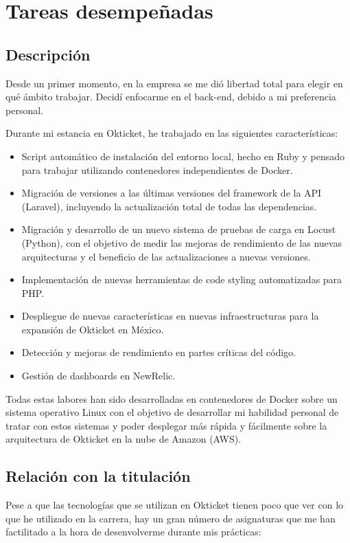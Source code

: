 \chapter{Tareas desempeñadas}
\section{Descripción}
Desde un primer momento, en la empresa se me dió libertad total para elegir en qué ámbito
trabajar. Decidí enfocarme en el back-end, debido a mi preferencia personal.

Durante mi estancia en Okticket, he trabajado en las siguientes características:
\begin{itemize}
	\item Script automático de instalación del entorno local, hecho en Ruby y pensado para
		trabajar utilizando contenedores independientes de Docker.
	\item Migración de versiones a las últimas versiones del framework de la API (Laravel),
		incluyendo la actualización total de todas las dependencias.
	\item Migración y desarrollo de un nuevo sistema de pruebas de carga en Locust (Python),
		con el objetivo de medir las mejoras de rendimiento de las nuevas arquitecturas y el
		beneficio de las actualizaciones a nuevas versiones.
	\item Implementación de nuevas herramientas de code styling automatizadas para PHP{.}
	\item Despliegue de nuevas características en nuevas infraestructuras para la expansión
		de Okticket en México.
	\item Detección y mejoras de rendimiento en partes críticas del código.
	\item Gestión de dashboards en NewRelic.
\end{itemize}

Todas estas labores han sido desarrolladas en contenedores de Docker sobre un sistema
operativo Linux con el objetivo de desarrollar mi habilidad personal de tratar con estos
sistemas y poder desplegar más rápida y fácilmente sobre la arquitectura de Okticket en la
nube de Amazon (AWS).

\newpage{}
\section{Relación con la titulación}
Pese a que las tecnologías que se utilizan en Okticket tienen poco que ver con lo que
he utilizado en la carrera, hay un gran número de asignaturas que me han factilitado a la
hora de desenvolverme durante mis prácticas:

